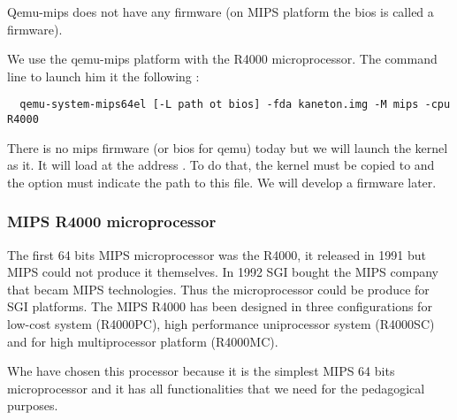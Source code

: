 Qemu-mips does not have any firmware (on MIPS platform the bios is called a firmware).

We use the qemu-mips platform with the R4000 microprocessor. The command line to launch him it the following :

\begin{verbatim}
  qemu-system-mips64el [-L path ot bios] -fda kaneton.img -M mips -cpu R4000
\end{verbatim}

There is no mips firmware (or bios for qemu) today but we will launch the kernel as it. It will load at the address . To do that, the kernel must be copied to  and the  option must indicate the path to this file. We will develop a firmware later.

\subsubsection{MIPS R4000 microprocessor}

The first 64 bits MIPS microprocessor was the R4000, it released in 1991 but MIPS could not produce it themselves.
In 1992 SGI bought the MIPS company that becam MIPS technologies. Thus the microprocessor could be produce for SGI platforms. The MIPS R4000 has been designed in three configurations for low-cost system (R4000PC), high performance uniprocessor system (R4000SC) and for high multiprocessor platform (R4000MC).

Whe have chosen this processor because it is the simplest MIPS 64 bits microprocessor and it has all functionalities that we need for the pedagogical purposes.
